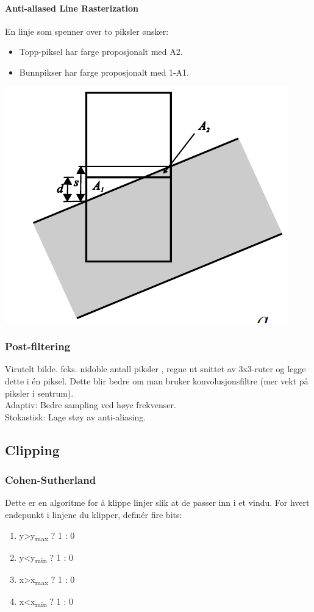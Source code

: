 \paragraph{Anti-aliased Line Rasterization}
En linje som spenner over to piksler ønsker:
\begin{itemize}
    \item Topp-piksel har farge proposjonalt med A2.
    \item Bunnpikser har farge proposjonalt med 1-A1.
\end{itemize}
\includegraphics[width=\textwidth]{Bilder/aalr.png}

\subsubsection{Post-filtering}
Virutelt bilde. feks. nidoble antall piksler , regne ut snittet av 3x3-ruter og legge dette i én piksel. Dette blir bedre om man bruker konvolusjonsfiltre (mer vekt på piksler i sentrum).
\\Adaptiv: Bedre sampling ved høye frekvenser.
\\Stokastisk: Lage støy av anti-aliasing.
    

\subsection{Clipping}\label{subsection:clipping}
\subsubsection{Cohen-Sutherland}
Dette er en algoritme for å klippe linjer slik at de passer inn i et vindu. For hvert endepunkt i linjene du klipper, definér fire bits:
\begin{enumerate}
    \item y\textgreater y\textsubscript{max} ? 1 : 0
    \item y\textless y\textsubscript{min} ? 1 : 0
    \item x\textgreater x\textsubscript{max} ? 1 : 0
    \item x\textless x\textsubscript{min} ? 1 : 0
\end{enumerate}

